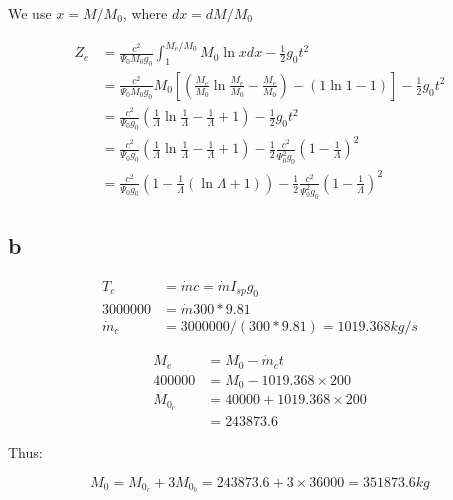 We use $x = M/M_0$, where $dx = dM/M_0$

\begin{equation}
    \begin{split}
        Z_e  &= \frac{c^2}{\Psi_0 M_0 g_0} \int_{1}^{M_e/M_0} M_0 \ln{x} dx - \frac{1}{2}g_0 t^2 \\
        &= \frac{c^2}{\Psi_0 M_0 g_0} M_0 [(\frac{M_e}{M_0} \ln{\frac{M_e}{M_0}} - \frac{M_e}{M_0}) -(1 \ln{1} - 1) ] - \frac{1}{2}g_0 t^2 \\
        &= \frac{c^2}{\Psi_0 g_0} (\frac{1}{\Lambda} \ln{\frac{1}{\Lambda}} - \frac{1}{\Lambda} + 1)- \frac{1}{2}g_0 t^2 \\
        &= \frac{c^2}{\Psi_0 g_0} (\frac{1}{\Lambda} \ln{\frac{1}{\Lambda}} - \frac{1}{\Lambda} + 1) - \frac{1}{2} \frac{c^2}{\Psi_0^2 g_0} (1 - \frac{1}{\Lambda})^2 \\ &= 
        \frac{c^2}{\Psi_0 g_0}(1-\frac{1}{\Lambda} (\ln{\Lambda} +1)) - \frac{1}{2} \frac{c^2}{\Psi_0^2 g_0} (1 - \frac{1}{\Lambda})^2
    \end{split}
\end{equation}

\subsection*{b}

\begin{equation}
\begin{split}
    T_{c} &= \dot{m} c = \dot{m}I_{sp}g_0 \\
    3000000 &= \dot{m} 300 * 9.81 \\
    \dot{m}_c &= 3000000/(300*9.81) = 1019.368 kg/s
 \end{split}
\end{equation}

\begin{equation}
    \begin{split}
        M_e &= M_0  - \dot{m}_c t \\
        400000 &= M_0 - 1019.368 \times 200 \\
        M_0_c &= 40000+1019.368\times 200 \\
        &= 243873.6
    \end{split}
\end{equation}

Thus:

\begin{equation}
    M_0 = M_0_c + 3M_0_b = 243873.6 + 3 \times 36000 = 351873.6 kg
\end{equation}


